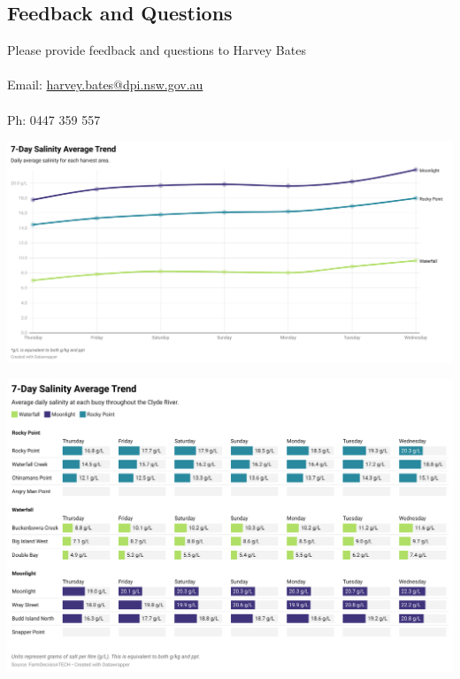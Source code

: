 \documentclass[10pt]{article}
\begin{document}
\subsection*{Feedback and Questions}
Please provide feedback and questions to Harvey Bates \\ \\
Email: \href{mailto:harvey.bates@dpi.nsw.gov.au}{harvey.bates@dpi.nsw.gov.au} \\ \\
Ph: 0447 359 557


\begin{SidewaysFigure}
\centering
\includegraphics[width=1.3\textwidth]{weekly-salinity-chart.png}
\end{SidewaysFigure}
\vfill
\newpage

\begin{SidewaysFigure}
\centering
\includegraphics[width=1.3\textwidth]{weekly-salinity.png}
\end{SidewaysFigure}
\vfill
\newpage
\end{document}
